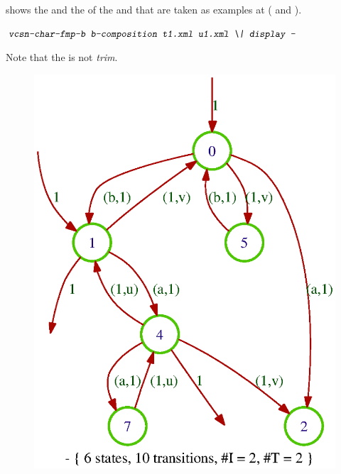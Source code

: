 \Exam
{} shows the  and the 
 of the \fmpts {} and  that 
are taken as examples at  (\cf {} and 
).
\begin{shell}
$ \kbd{vcsn-char-fmp-b b-composition t1.xml u1.xml \bslash| display -}
$ 
\end{shell}%
Note that the  is not \emph{trim}.


\begin{figure}[ht]
    \centering
\includegraphics[scale=0.5]{figures/comp2.ps}
\ee

\end{figure}
